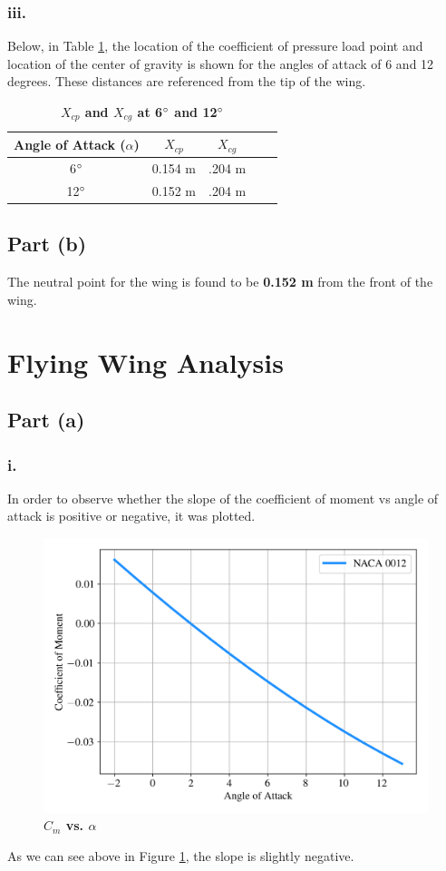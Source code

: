 \begin{singlespace}
\subsubsection{iii.}
Below, in Table \ref{table:2aiii}, the location of the coefficient of pressure load point and location of the center of gravity is shown for the angles of attack of 6 and 12 degrees. These distances are referenced from the tip of the wing.
\begin{table}[H]
    \begin{center}
        \caption{\textbf{$X_{cp} $ and $X_{cg}$ at 6$\degree$ and 12$\degree$}} \label{table:2aiii}
        \begin{tabular}{|c|c|c|c|c|} %
            \hline \textbf{Angle of Attack ($\alpha$)} & \textbf{$X_{cp}$} & \textbf{$X_{cg}$} \\ \hline %
            6$\degree$ & 0.154 m & .204 m \\ \hline
           12$\degree$ & 0.152 m & .204 m \\ \hline
        \end{tabular}
\end{center}
\end{table}
\subsection{Part (b)}
The neutral point for the wing is found to be \textbf{0.152 m} from the front of the wing.

\section{Flying Wing Analysis}
\subsection{Part (a)}
\subsubsection{i.}
In order to observe whether the slope of the coefficient of moment vs angle of attack is positive or negative, it was plotted.

\begin{figure}[H]
        \centering
        \includegraphics[width=.7\textwidth]{homeworks/homework3/george/plots/problem3_ai.png}
        \caption{\textbf{$C_m$ vs. $\alpha$}}
        \label{fig:3ai}
\end{figure}
As we can see above in Figure \ref{fig:3ai}, the slope is slightly negative.

\end{singlespace}
